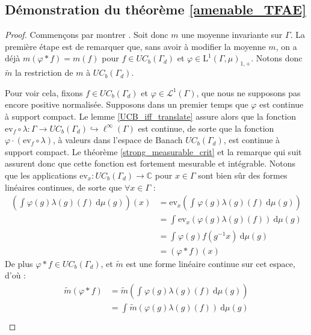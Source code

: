\documentclass[a4paper,12pt]{article}
\newcommand{\C}{\mathbb{C}}
\newcommand{\ev}{\mathrm{ev}}
\newcommand{\integral}[4]{\int_{#1}^{#2} #3~\mathrm{d}#4}
\newcommand{\inv}{^{-1}}
\newcommand{\comp}{\circ}
\renewcommand{\implies}{\Rightarrow}
\begin{document}
\subsection{Démonstration du théorème \ref{amenable_TFAE}} 

\begin{proof}
    Commençons par montrer \framebox{$(\ref{amenable_TFAE/amenable})\implies(\ref{amenable_TFAE/topological_mean})$}. Soit donc 
    $m$ une moyenne invariante sur $\Gamma$. La première étape est de remarquer que, sans avoir à modifier la moyenne 
    $m$, on a déjà $m(\varphi\ast f) = m(f)$ pour $f\in UC_b(\Gamma_d)$ et $\varphi\in\mathrm{L}^1(\Gamma, \mu)_{1, +}$.
    Notons donc $\widetilde{m}$ la restriction de $m$ à $UC_b(\Gamma_d)$.

    Pour voir cela, fixons $f\in UC_b(\Gamma_d)$ et $\varphi\in\mathscr{L}^1(\Gamma)$, que nous ne supposons pas encore positive normalisée.
    Supposons dans un premier temps que $\varphi$ est continue à support compact. Le lemme \ref{UCB_iff_translate} assure 
    alors que la fonction $\ev_f\comp\lambda:\Gamma\to UC_b(\Gamma_d)\hookrightarrow\ell^\infty(\Gamma)$ est continue,
    de sorte que la fonction $\varphi\cdot(\ev_f\comp\lambda)$, à valeurs dans l'espace de Banach $UC_b(\Gamma_d)$, est continue à support compact.
    Le théorème \ref{strong_measurable_crit} et la remarque qui suit assurent donc que cette fonction est fortement mesurable et intégrable.
    Notons que les applications $\ev_x:UC_b(\Gamma_d)\to\C$ pour $x\in\Gamma$ sont bien sûr des formes linéaires continues, de sorte que $\forall x\in\Gamma$ :
    \begin{align*}
        \left(\integral{}{}{\varphi(g)\lambda(g)(f)}{\mu(g)}\right)(x) 
            &= \ev_x\left(\integral{}{}{\varphi(g)\lambda(g)(f)}{\mu(g)}\right) \\
            &= \integral{}{}{\ev_x(\varphi(g)\lambda(g)(f))}{\mu(g)} \\
            &= \integral{}{}{\varphi(g)f(g\inv x)}{\mu(g)} \\
            &= (\varphi\ast f)(x)
    \end{align*}
    De plus $\varphi\ast f\in UC_b(\Gamma_d)$, et $\widetilde{m}$ est une forme linéaire continue sur cet espace, d'où :
    \begin{align*}
        \widetilde{m}(\varphi\ast f) 
            &= \widetilde{m}\left(\integral{}{}{\varphi(g)\lambda(g)(f)}{\mu(g)}\right) \\
            &= \integral{}{}{\widetilde{m}(\varphi(g)\lambda(g)(f))}{\mu(g)} \\

\end{align*}
\end{proof}
\end{document}
